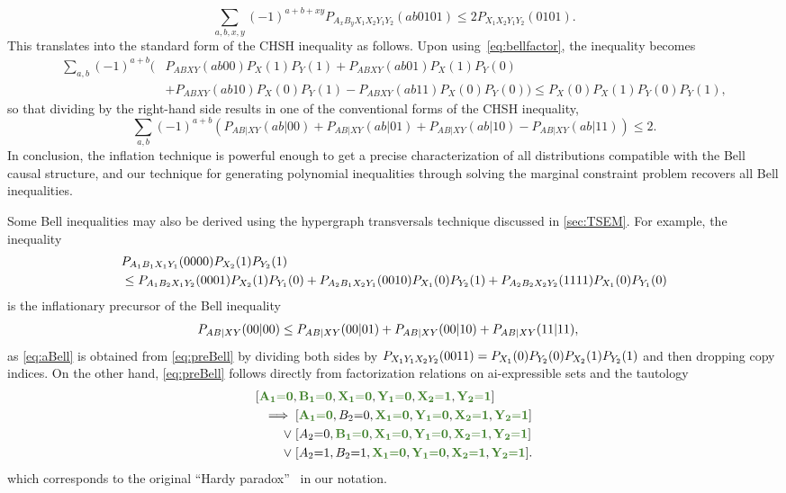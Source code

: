 \documentclass[aps,english,10pt,superscriptaddress,onecolumn,twoside,longbibliography,pra,floatfix,fleqn,nofootinbib]{revtex4-1}
\newcommand*{\mgreen}[1]{{\color{OliveGreen}{\mathbf{#1}}}}
\theoremstyle{definition}
\newcounter{example}[section]
\newcommand{\p}[2][]{{P_{#1}}\parenths{#2}}
\newcommand{\eql}{\mathord{=}}
\DeclarePairedDelimiter{\parenths}{\lparen}{\rparen}
\begin{document}
\[
	\sum_{a,b,x,y} (-1)^{a + b + xy} P_{A_x B_y X_1 X_2 Y_1 Y_2}(a b 0 1 0 1) \leq 2 P_{X_1 X_2 Y_1 Y_2}(0101).
\]
This translates into the standard form of the CHSH inequality as follows. Upon using~\cref{eq:bellfactor}, the inequality becomes
\begin{align*}
	\sum_{a,b} (-1)^{a + b} \big( & P_{A B X Y}(ab00)P_X(1)P_Y(1) + P_{A B X Y}(ab01)P_X(1)P_Y(0) \\[-4pt]
	& + P_{A B X Y}(ab10)P_X(0)P_Y(1) - P_{A B X Y}(ab11)P_X(0)P_Y(0) \big) \leq P_X(0)P_X(1)P_Y(0)P_Y(1),
\end{align*}
so that dividing by the right-hand side results in one of the conventional forms of the CHSH inequality,
\[
	\sum_{a,b} (-1)^{a + b} \left( P_{AB|XY}(ab|00) + P_{AB|XY}(ab|01) + P_{AB|XY}(ab|10) - P_{AB|XY}(ab|11) \right) \leq 2.
\]
In conclusion, the inflation technique is powerful enough to get a precise characterization of all distributions compatible with the Bell causal structure, and our technique for generating polynomial inequalities through solving the marginal constraint problem recovers all Bell inequalities.

Some Bell inequalities may also be derived using the hypergraph transversals technique discussed in \cref{sec:TSEM}. For example, the inequality
\begin{align}\label{eq:preBell}\begin{split}
& \p[A_1 B_1 X_1 Y_1]{0000}\p[X_2]{1} \p[Y_2]{1} \\
&\leq
 \p[A_1 B_2 X_1 Y_2]{0001}\p[X_2]{1} \p[Y_1]{0} +\p[A_2 B_1 X_2 Y_1]{0010}\p[X_1]{0}\p[Y_2]{1}+  \p[A_2 B_2 X_2 Y_2]{1111}\p[X_1]{0} \p[Y_1]{0}
\end{split}\end{align}
is the inflationary precursor of the Bell inequality
\begin{align}\label{eq:aBell}
 \p[A B | X Y]{00|00} &\leq \p[A B | X Y]{00|01} +\p[A B | X Y]{00|10}+  \p[A B | X Y]{11|11},
\end{align}
as \cref{eq:aBell} is obtained from \cref{eq:preBell} by dividing both sides by $\p[X_1 Y_1 X_2 Y_2]{0011}=\p[X_1]{0} \p[Y_2]{0}\p[X_2]{1} \p[Y_2]{1}$ and then dropping copy indices. On the other hand, \cref{eq:preBell} follows directly from factorization relations on ai-expressible sets and the tautology
\begin{align}\begin{split}
	[ \mgreen{A_1 \eql 0},\, & \mgreen{B_1 \eql 0}, \mgreen{X_1 \eql 0}, \mgreen{Y_1\eql 0}, \mgreen{X_2 \eql 1}, \mgreen{Y_2 \eql 1}]\\
 \implies 
	[ & \mgreen{A_1 \eql 0}, B_2 \eql 0, \mgreen{X_1 \eql 0}, \mgreen{Y_1\eql 0}, \mgreen{X_2 \eql 1}, \mgreen{Y_2 \eql 1}] \\
	\mathrel{\lor} [ & A_2 \eql 0, \mgreen{B_1 \eql 0}, \mgreen{X_1 \eql 0}, \mgreen{Y_1\eql 0}, \mgreen{X_2 \eql 1}, \mgreen{Y_2 \eql 1}] \\
	\mathrel{\lor} [ & A_2 \eql 1, B_2 \eql 1, \mgreen{X_1 \eql 0}, \mgreen{Y_1\eql 0}, \mgreen{X_2 \eql 1}, \mgreen{Y_2 \eql 1}].
\end{split}\end{align}
which corresponds to the original ``Hardy paradox''~\cite{L.Hardy:PRL:1665} in our notation.

\renewcommand\section{\stdsection}
\let\cleardoublepage\clearpage
\setlength{\bibsep}{3pt plus 3pt minus 2pt}


\end{document}
